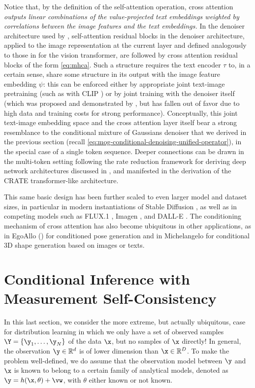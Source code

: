 \documentclass[../../book-main.tex]{subfiles}
\begin{document}
Notice that, by the definition of the self-attention operation, cross attention
\textit{outputs linear combinations of the value-projected text embeddings
weighted by correlations between the image features and the text embeddings.}
In the denoiser architecture used by \textcite{rombach2022high}, 
self-attention residual blocks in the denoiser architecture, applied to the
image representation at the current layer and defined analogously
to those in  for the vision transformer, are followed by cross
attention residual blocks of the form \eqref{eq:mhca}.
Such a structure requires the text encoder $\tau$ to, in a certain sense, share some
structure in its output with the image feature embedding $\psi$: this can be
enforced either by appropriate joint text-image pretraining (such as with CLIP
\cite{Radford2021-ir}) or by joint training with
the denoiser itself (which was proposed and demonstrated by
\textcite{rombach2022high}, but has fallen out of favor due to high data and
training costs for strong performance).
Conceptually, this joint text-image embedding space and the cross attention
layer itself bear a strong resemblance to the
conditional mixture of Gaussians denoiser that we derived in the previous
section (recall \eqref{eq:mog-conditional-denoising-unified-operator}), in the
special case of a single token sequence. Deeper
connections can be drawn in the multi-token setting following the rate reduction
framework for deriving deep network architectures discussed in
, and manifested in the derivation of the CRATE
transformer-like architecture.

This same basic design has been further scaled to even larger model and dataset
sizes, in particular in modern instantiations of Stable Diffusion
\cite{DBLP:conf/icml/EsserKBEMSLLSBP24}, as well as in competing models such as
FLUX.1 \cite{Labs2025-fb}, Imagen \cite{Saharia2022-na}, and DALL-E \cite{Ramesh2022-nu}. 
The conditioning mechanism of cross attention has also become ubiquitous in
other applications, as in EgoAllo () for conditioned pose generation and in Michelangelo \cite{zhao2023michelangelo} for conditional 3D shape generation based on images or texts. 




\section{Conditional Inference with Measurement Self-Consistency}
\label{sec:measurement-self-consistency}
In this last section, we consider the more extreme, but actually ubiquitous, case for distribution learning in which we only have a set of observed samples $\Y = \{\y_1,\ldots, \y_N\}$ of the data $\x$, but no samples of $\x$ directly! In general, the observation $\y \in \mathbb{R}^d$ is of lower dimension than $\x \in \mathbb{R}^D$. To make the problem well-defined, we do assume that the observation model between $\y$ and $\x$ is known to belong to a certain family of analytical models, denoted as $\y = h(\x, \theta) +\vw$, with $\theta$ either known or not known. 
\end{document}
